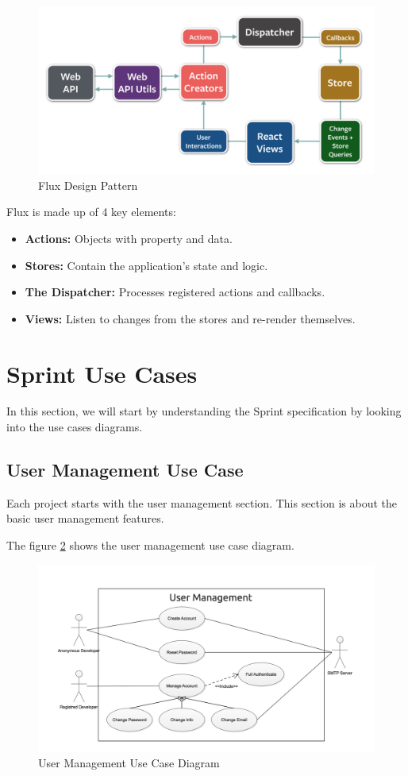 \begin{spacing}{1.2}
\begin{figure}[H]\centering
\includegraphics[scale=0.3]{Fluxdesignpattern.png}
\caption{Flux Design Pattern}
\label{usermanagementusecase}
\end{figure}

Flux is made up of 4 key elements:

\begin{itemize}
	\item \textbf{Actions:} Objects with property and data.
	\item \textbf{Stores:} Contain the application's state and logic.
	\item \textbf{The Dispatcher:} Processes registered actions and callbacks.
	\item \textbf{Views:} Listen to changes from the stores and re-render themselves.
\end{itemize}

\section{Sprint Use Cases}
In this section, we will start by understanding the Sprint specification by looking into the use cases diagrams.

\subsection{User Management Use Case}
Each project starts with the user management section. This section is about the basic user management features.

The figure \ref{usermanagementusecase} shows the user management use case diagram.
\begin{figure}[H]\centering
\includegraphics[scale=0.3]{userusecase.png}
\caption{User Management Use Case Diagram}
\label{usermanagementusecase}
\end{figure}



\end{spacing}
